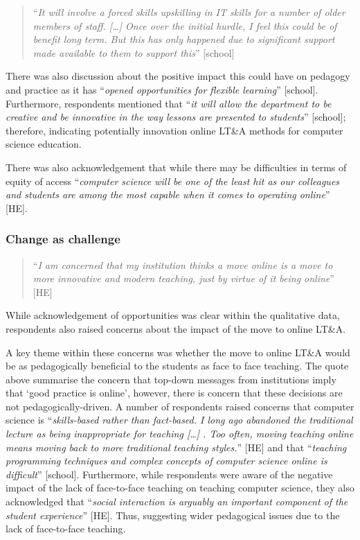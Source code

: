 \documentclass[sigconf]{acmart}
\begin{document}
\begin{quotation}
``{\emph{It will involve a forced skills upskilling in IT skills for a
number of older members of staff. […] Once over the initial hurdle, I
feel this could be of benefit long term. But this has only happened
due to significant support made available to them to support this}}''
[school]
\end{quotation}

There was also discussion about the positive impact this could have on
pedagogy and practice as it has ``{\emph{opened opportunities for
    flexible learning}}” [school]. Furthermore, respondents mentioned that
``{\emph{it will allow the department to be creative and be innovative
in the way lessons are presented to students}}'' [school]; therefore,
indicating potentially innovation online LT\&A methods for computer
science education.

There was also acknowledgement that while there may be difficulties in
terms of equity of access ``{\emph{computer science will be one of the
least hit as our colleagues and students are among the most capable
when it comes to operating online}}'' [HE].

\subsubsection*{Change as challenge}

\begin{quotation}
``{\emph{I am concerned that my institution thinks a move online is a
move to more innovative and modern teaching, just by virtue of it
being online}}'' [HE]
\end{quotation}

While acknowledgement of opportunities was clear within the
qualitative data, respondents also raised concerns about the impact of
the move to online LT\&A.

A key theme within these concerns was whether the move to online LT\&A
would be as pedagogically beneficial to the students as face to face
teaching. The quote above summarise the concern that top-down messages
from institutions imply that `good practice is online', however, there
is concern that these decisions are not pedagogically-driven. A number
of respondents raised concerns that computer science is
``{\emph{skills-based rather than fact-based.  I long ago abandoned
the traditional lecture as being inappropriate for teaching […] .  Too
often, moving teaching online means moving back to more traditional
teaching styles.}}” [HE] and that ``{\emph{teaching programming
techniques and complex concepts of computer science online is
difficult}}'' [school]. Furthermore, while respondents were aware of
the negative impact of the lack of face-to-face teaching on teaching
computer science, they also acknowledged that ``{\emph{social
interaction is arguably an important component of the student
experience}}'' [HE]. Thus, suggesting wider pedagogical issues due to
the lack of face-to-face teaching.
\end{document}
